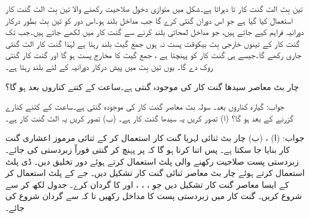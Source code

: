 تین بِٹ الٹ گنت کار  تا  دہراتا ہے۔شکل     میں متوازی دخول صلاحیت رکھنے والا تین بِٹ الٹ گنت کار استعمال کیا گیا ہے جو اس دوران گنتی کرے گا جب مداخل  بلند ہو۔اس دور کو تین بِٹ بطور درکار دورانیہ  فراہم کیے جاتے ہیں، جو  مداخل لمحاتی بلند کرنے سے گنت کار میں لکھے جاتے ہیں۔جب تک گنت کار کے تینوں خارجی بِٹ  بیکوقت پست  نہ ہوں جمع گیٹ بلند رہتا ہے  لہٰذا  گنت کار الٹ گنتی جاری رکھے گا۔جیسے ہی گنت کار  کو پہنچتا ہے ، جمع گیٹ کا مخارج پست ہو گا اور گنت کار گنتی روک دے گا۔  یوں تین بِٹ میں پیش درکار  دورانیہ   کے لئے    بلند رہتا ہے۔


 چار بٹ معاصر سیدھا گنت کار کی موجودہ گنتی   ہے۔ساعت کے کتنے کناروں بعد   ہو گا؟
 
 جواب: گیارہ کناروں بعد۔
 سولہ بٹ معاصر گنت کار کی موجودہ گنتی  ہے۔ساعت کے کتنے کنارے گزرنے کے بعد  ہو گا؟ (ا) تصور کریں یہ سیدھا گنت کار ہے۔ (ب) تصور کریں یہ الٹ گنت کار ہے۔
 
 جواب: (ا)  ، (ب)    
 چار بٹ ثنائی لہریا گنت کار  استعمال کر کے  ثنائی مرموز اعشاری گنت کار  بنایا جا سکتا ہے۔ پس اتنا کرنا ہو گا کہ  پر پہنچ کر  گنتی   فوراً زبردستی  کی جائے۔ زبردستی پست صلاحیت رکھنے والی پلٹ استعمال کرتے ہوئے   دور تخلیق دیں۔ 
 ڈی پلٹ استعمال کرتے ہوئے چار بٹ معاصر ثنائی گنت کار تشکیل دیں۔ 
 جے کے پلٹ استعمال کر کے  ایسا معاصر گنت کار تشکیل دیں  جو   ، ، ، اور    کا گردان کرے۔ جدول  لکھ کر سے شروع کریں۔ گنت کار میں زبردستی پست کا مداخل رکھیں تا کہ  سے گردان شروع کی جائے۔
 
